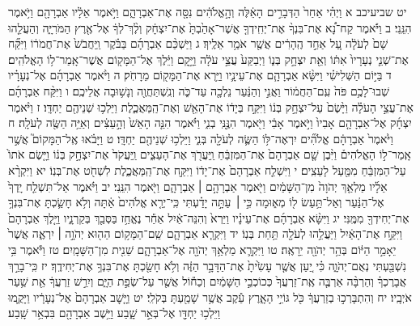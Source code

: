 \documentclass[twoside, openany, parskip=half, 11pt]{book}
\begin{document}
יט שביעיכב א וַיְהִ֗י אַחַר֙ הַדְּבָרִ֣ים הָאֵ֔לֶּה וְהָ֣אֱלֹהִ֔ים נִסָּ֖ה אֶת־אַבְרָהָ֑ם וַיֹּ֣אמֶר אֵלָ֔יו אַבְרָהָ֖ם וַיֹּ֥אמֶר הִנֵּֽנִי׃ ב וַיֹּ֡אמֶר קַח־נָ֠א אֶת־בִּנְךָ֨ אֶת־יְחִֽידְךָ֤ אֲשֶׁר־אָהַ֙בְתָּ֙ אֶת־יִצְחָ֔ק וְלֶ֨ךְ־לְךָ֔ אֶל־אֶ֖רֶץ הַמֹּרִיָּ֑ה וְהַעֲלֵ֤הוּ שָׁם֙ לְעֹלָ֔ה עַ֚ל אַחַ֣ד הֶֽהָרִ֔ים אֲשֶׁ֖ר אֹמַ֥ר אֵלֶֽיךָ׃ ג וַיַּשְׁכֵּ֨ם אַבְרָהָ֜ם בַּבֹּ֗קֶר וַֽיַּחֲבֹשׁ֙ אֶת־חֲמֹר֔וֹ וַיִּקַּ֞ח אֶת־שְׁנֵ֤י נְעָרָיו֙ אִתּ֔וֹ וְאֵ֖ת יִצְחָ֣ק בְּנ֑וֹ וַיְבַקַּע֙ עֲצֵ֣י עֹלָ֔ה וַיָּ֣קׇם וַיֵּ֔לֶךְ אֶל־הַמָּק֖וֹם אֲשֶׁר־אָֽמַר־ל֥וֹ הָאֱלֹהִֽים׃ ד בַּיּ֣וֹם הַשְּׁלִישִׁ֗י וַיִּשָּׂ֨א אַבְרָהָ֧ם אֶת־עֵינָ֛יו וַיַּ֥רְא אֶת־הַמָּק֖וֹם מֵרָחֹֽק׃ ה וַיֹּ֨אמֶר אַבְרָהָ֜ם אֶל־נְעָרָ֗יו שְׁבוּ־לָכֶ֥ם פֹּה֙ עִֽם־הַחֲמ֔וֹר וַאֲנִ֣י וְהַנַּ֔עַר נֵלְכָ֖ה עַד־כֹּ֑ה וְנִֽשְׁתַּחֲוֶ֖ה וְנָשׁ֥וּבָה אֲלֵיכֶֽם׃ ו וַיִּקַּ֨ח אַבְרָהָ֜ם אֶת־עֲצֵ֣י הָעֹלָ֗ה וַיָּ֙שֶׂם֙ עַל־יִצְחָ֣ק בְּנ֔וֹ וַיִּקַּ֣ח בְּיָד֔וֹ אֶת־הָאֵ֖שׁ וְאֶת־הַֽמַּאֲכֶ֑לֶת וַיֵּלְכ֥וּ שְׁנֵיהֶ֖ם יַחְדָּֽו׃ ז וַיֹּ֨אמֶר יִצְחָ֜ק אֶל־אַבְרָהָ֤ם אָבִיו֙ וַיֹּ֣אמֶר אָבִ֔י וַיֹּ֖אמֶר הִנֶּ֣נִּֽי בְנִ֑י וַיֹּ֗אמֶר הִנֵּ֤ה הָאֵשׁ֙ וְהָ֣עֵצִ֔ים וְאַיֵּ֥ה הַשֶּׂ֖ה לְעֹלָֽה׃ ח וַיֹּ֙אמֶר֙ אַבְרָהָ֔ם אֱלֹהִ֞ים יִרְאֶה־לּ֥וֹ הַשֶּׂ֛ה לְעֹלָ֖ה בְּנִ֑י וַיֵּלְכ֥וּ שְׁנֵיהֶ֖ם יַחְדָּֽו׃ ט וַיָּבֹ֗אוּ אֶֽל־הַמָּקוֹם֮ אֲשֶׁ֣ר אָֽמַר־ל֣וֹ הָאֱלֹהִים֒ וַיִּ֨בֶן שָׁ֤ם אַבְרָהָם֙ אֶת־הַמִּזְבֵּ֔חַ וַֽיַּעֲרֹ֖ךְ אֶת־הָעֵצִ֑ים וַֽיַּעֲקֹד֙ אֶת־יִצְחָ֣ק בְּנ֔וֹ וַיָּ֤שֶׂם אֹתוֹ֙ עַל־הַמִּזְבֵּ֔חַ מִמַּ֖עַל לָעֵצִֽים׃ י וַיִּשְׁלַ֤ח אַבְרָהָם֙ אֶת־יָד֔וֹ וַיִּקַּ֖ח אֶת־הַֽמַּאֲכֶ֑לֶת לִשְׁחֹ֖ט אֶת־בְּנֽוֹ׃ יא וַיִּקְרָ֨א אֵלָ֜יו מַלְאַ֤ךְ יְהֹוָה֙ מִן־הַשָּׁמַ֔יִם וַיֹּ֖אמֶר אַבְרָהָ֣ם ׀ אַבְרָהָ֑ם וַיֹּ֖אמֶר הִנֵּֽנִי׃ יב וַיֹּ֗אמֶר אַל־תִּשְׁלַ֤ח יָֽדְךָ֙ אֶל־הַנַּ֔עַר וְאַל־תַּ֥עַשׂ ל֖וֹ מְא֑וּמָה כִּ֣י ׀ עַתָּ֣ה יָדַ֗עְתִּי כִּֽי־יְרֵ֤א אֱלֹהִים֙ אַ֔תָּה וְלֹ֥א חָשַׂ֛כְתָּ אֶת־בִּנְךָ֥ אֶת־יְחִידְךָ֖ מִמֶּֽנִּי׃ יג וַיִּשָּׂ֨א אַבְרָהָ֜ם אֶת־עֵינָ֗יו וַיַּרְא֙ וְהִנֵּה־אַ֔יִל אַחַ֕ר נֶאֱחַ֥ז בַּסְּבַ֖ךְ בְּקַרְנָ֑יו וַיֵּ֤לֶךְ אַבְרָהָם֙ וַיִּקַּ֣ח אֶת־הָאַ֔יִל וַיַּעֲלֵ֥הוּ לְעֹלָ֖ה תַּ֥חַת בְּנֽוֹ׃ יד וַיִּקְרָ֧א אַבְרָהָ֛ם שֵֽׁם־הַמָּק֥וֹם הַה֖וּא יְהֹוָ֣ה ׀ יִרְאֶ֑ה אֲשֶׁר֙ יֵאָמֵ֣ר הַיּ֔וֹם בְּהַ֥ר יְהֹוָ֖ה יֵרָאֶֽה׃ טו וַיִּקְרָ֛א מַלְאַ֥ךְ יְהֹוָ֖ה אֶל־אַבְרָהָ֑ם שֵׁנִ֖ית מִן־הַשָּׁמָֽיִם׃ טז וַיֹּ֕אמֶר בִּ֥י נִשְׁבַּ֖עְתִּי נְאֻם־יְהֹוָ֑ה כִּ֗י יַ֚עַן אֲשֶׁ֤ר עָשִׂ֙יתָ֙ אֶת־הַדָּבָ֣ר הַזֶּ֔ה וְלֹ֥א חָשַׂ֖כְתָּ אֶת־בִּנְךָ֥ אֶת־יְחִידֶֽךָ׃ יז כִּֽי־בָרֵ֣ךְ אֲבָרֶכְךָ֗ וְהַרְבָּ֨ה אַרְבֶּ֤ה אֶֽת־זַרְעֲךָ֙ כְּכוֹכְבֵ֣י הַשָּׁמַ֔יִם וְכַח֕וֹל אֲשֶׁ֖ר עַל־שְׂפַ֣ת הַיָּ֑ם וְיִרַ֣שׁ זַרְעֲךָ֔ אֵ֖ת שַׁ֥עַר אֹיְבָֽיו׃ יח וְהִתְבָּרְכ֣וּ בְזַרְעֲךָ֔ כֹּ֖ל גּוֹיֵ֣י הָאָ֑רֶץ עֵ֕קֶב אֲשֶׁ֥ר שָׁמַ֖עְתָּ בְּקֹלִֽי׃ יט וַיָּ֤שׇׁב אַבְרָהָם֙ אֶל־נְעָרָ֔יו וַיָּקֻ֛מוּ וַיֵּלְכ֥וּ יַחְדָּ֖ו אֶל־בְּאֵ֣ר שָׁ֑בַע וַיֵּ֥שֶׁב אַבְרָהָ֖ם בִּבְאֵ֥ר שָֽׁבַע׃
\end{document}
